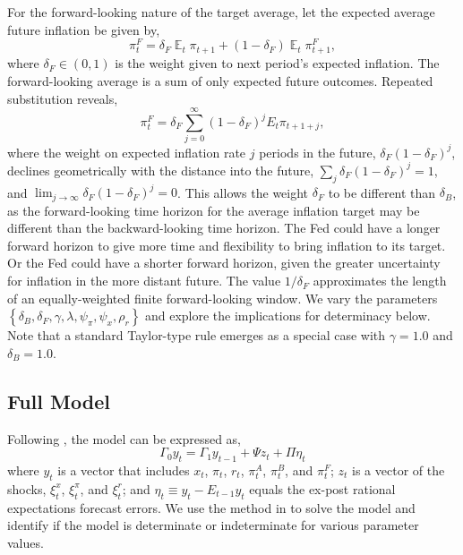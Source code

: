 \documentclass[english,authoryear,12pt]{elsarticle}
\DeclareMathOperator{\E}{\mathbb{E}}
\begin{document}
For the forward-looking nature of the target average, let the expected average future inflation be given by,
\begin{equation}\label{eq:forward}
	\pi_t^F = \delta_F \E_t \pi_{t+1} + (1-\delta_F) \E_t \pi_{t+1}^F,
\end{equation}
where $\delta_F \in (0,1)$ is the weight given to next period's expected inflation. The forward-looking average is a sum of only expected future outcomes. Repeated substitution reveals,
\begin{equation}\label{eq:forward_all}
	\pi_t^F = \delta_F \sum_{j=0}^{\infty} (1-\delta_F)^j E_t \pi_{t+1+j},
\end{equation}
where the weight on expected inflation rate $j$ periods in the future, $\delta_F (1-\delta_F)^{j}$, declines geometrically with the distance into the future, $\sum_j \delta_F (1-\delta_F)^{j}=1$, and $\lim_{j \to \infty} \delta_F (1-\delta_F)^j=0$. This allows the weight $\delta_F$ to be different than $\delta_B$, as the forward-looking time horizon for the average inflation target may be different than the backward-looking time horizon. The Fed could have a longer forward horizon to give more time and flexibility to bring inflation to its target. Or the Fed could have a shorter forward horizon, given the greater uncertainty for inflation in the more distant future. The value $1/ \delta_F$ approximates the length of an equally-weighted finite forward-looking window. We vary the parameters $\left\{\delta_B, \delta_F, \gamma, \lambda, \psi_\pi, \psi_x, \rho_r \right\}$ and explore the implications for determinacy below. Note that a standard Taylor-type rule emerges as a special case with $\gamma=1.0$ and $\delta_B=1.0$.

\subsection{Full Model}

Following \citet{sims2002}, the model can be expressed as,
\begin{equation}
	\Gamma_0 y_t = \Gamma_1 y_{t-1} + \Psi z_t + \Pi \eta_t
\end{equation}
where $y_t$ is a vector that includes $x_t$, $\pi_t$, $r_t$, $\pi_t^A$, $\pi_t^B$, and $\pi_t^F$; $z_t$ is a vector of the shocks, $\xi_t^x$, $\xi_t^\pi$, and $\xi_t^r$; and $\eta_t \equiv y_t - E_{t-1} y_t$ equals the ex-post rational expectations forecast errors. We use the method in \citet{sims2002} to solve the model and identify if the model is determinate or indeterminate for various parameter values.
\end{document}
